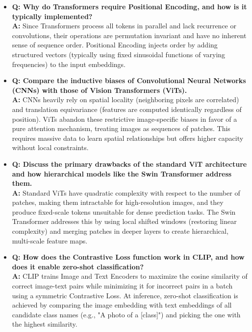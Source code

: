 \begin{itemize}
    \item \textbf{Q: Why do Transformers require Positional Encoding, and how is it typically implemented?} \\
    \textbf{A:} Since Transformers process all tokens in parallel and lack recurrence or convolutions, their operations are permutation invariant and have no inherent sense of sequence order. Positional Encoding injects order by adding structured vectors (typically using fixed sinusoidal functions of varying frequencies) to the input embeddings.

    \item \textbf{Q: Compare the inductive biases of Convolutional Neural Networks (CNNs) with those of Vision Transformers (ViTs).} \\
    \textbf{A:} CNNs heavily rely on spatial locality (neighboring pixels are correlated) and translation equivariance (features are computed identically regardless of position). ViTs abandon these restrictive image-specific biases in favor of a pure attention mechanism, treating images as sequences of patches. This requires massive data to learn spatial relationships but offers higher capacity without local constraints.

    \item \textbf{Q: Discuss the primary drawbacks of the standard ViT architecture and how hierarchical models like the Swin Transformer address them.} \\
    \textbf{A:} Standard ViTs have quadratic complexity with respect to the number of patches, making them intractable for high-resolution images, and they produce fixed-scale tokens unsuitable for dense prediction tasks. The Swin Transformer addresses this by using local shifted windows (restoring linear complexity) and merging patches in deeper layers to create hierarchical, multi-scale feature maps.

    \item \textbf{Q: How does the Contrastive Loss function work in CLIP, and how does it enable zero-shot classification?} \\
    \textbf{A:} CLIP trains Image and Text Encoders to maximize the cosine similarity of correct image-text pairs while minimizing it for incorrect pairs in a batch using a symmetric Contrastive Loss. At inference, zero-shot classification is achieved by comparing the image embedding with text embeddings of all candidate class names (e.g., "A photo of a [class]") and picking the one with the highest similarity.
\end{itemize}
